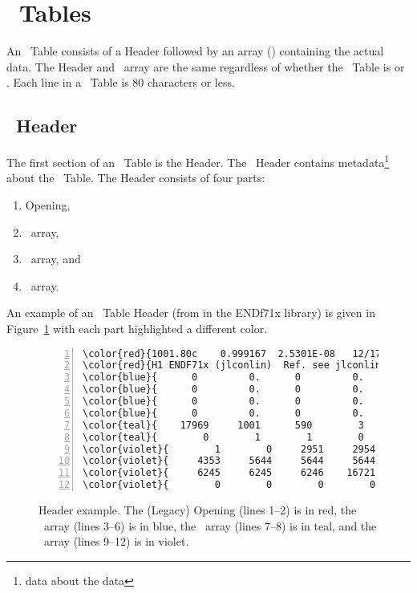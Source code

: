 \section{\ACE\ Tables}
An \ACE\ Table consists of a Header followed by an array (\XSS) containing the actual data. The Header and \XSS\ array are the same regardless of whether the \ACE\ Table is  or . Each line in a  \ACE\ Table is \num{80} characters or less. 

\subsection{\ACE\ Header}\label{sec:ACEHeader}
The first section of an \ACE\ Table is the Header. The \ACE\ Header contains metadata\footnote{data about the data} about the \ACE\ Table. The Header consists of four parts:
\begin{enumerate}
  \item Opening,
  \item \IZAW\ array,
  \item \NXS\ array, and
  \item \JXS\ array.
\end{enumerate}
An example of an \ACE\ Table Header (from  in the ENDf71x library) is given in Figure~\ref{fig:HeaderExample} with each part highlighted a different color.

\begin{figure}[h!] \centering
  \begin{Verbatim}[frame=single, fontsize=\footnotesize,commandchars=\\\{\},numbers=left,numbersep=2pt]
\color{red}{1001.80c    0.999167  2.5301E-08   12/17/12}
\color{red}{H1 ENDF71x (jlconlin)  Ref. see jlconlin (ref 09/10/2012  10:00:53)      mat 125}
\color{blue}{      0         0.      0         0.      0         0.      0         0.}
\color{blue}{      0         0.      0         0.      0         0.      0         0.}
\color{blue}{      0         0.      0         0.      0         0.      0         0.}
\color{blue}{      0         0.      0         0.      0         0.      0         0.}
\color{teal}{    17969     1001      590        3        0        1        1        0}
\color{teal}{        0        1        1        0        0        0        0        0}
\color{violet}{        1        0     2951     2954     2957     2960     2963     4352}
\color{violet}{     4353     5644     5644     5644     6234     6235     6236     6244}
\color{violet}{     6245     6245     6246    16721        0    16722        0        0}
\color{violet}{        0        0        0        0        0    16723    16724    16725}
\end{Verbatim}
\caption{Header example. The (Legacy) Opening (lines 1--2) is in {\color{red}red}, the \IZAW\ array (lines 3--6) is in {\color{blue}blue}, the \NXS\ array (lines 7--8) is in {\color{teal}teal}, and the \JXS\ array (lines 9--12) is in {\color{violet}violet}.}
  \label{fig:HeaderExample}
\end{figure}

